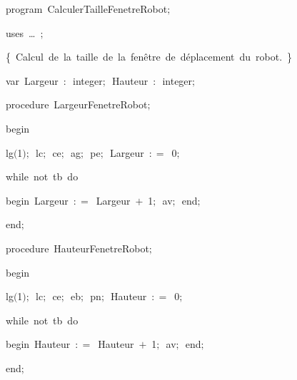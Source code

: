
{
\parindent {}
\medskip

\carrenoir
\vspace{\neglskip}\mbox{\blc  \idt  \mcl program\idt \ CalculerTailleFenetreRobot$;$
}\par 
\vspace{\neglskip}\mbox{\blc \blk\idt \mcl uses\idt \ \ldots\ $;$
}\par 
\vspace{\neglskip}\mbox{\blc  \blk\idt  \cmt  \{\ Calcul\ de\ la\ taille\ de\ la\ fen\^{e}tre\ de\ d\'{e}placement\ du\ robot.\ \}\idt }\par 
\pagebreak[3] 
\vspace{\neglskip}\mbox{\blc  \blk\idt  \mcl var\idt \ Largeur\ $:$\ integer$;$\ Hauteur\ $:$\ integer$;$\ }\par 
\medskip

\pagebreak[3] 
\vspace{\neglskip}\mbox{\blc  \blk\idt  \mcl procedure\idt \ LargeurFenetreRobot$;$}\par 
\vspace{\neglskip}\mbox{\blc  \blk\idt  \mcl begin\idt }\par 
\vspace{\neglskip}\mbox{\blc  \blk\blk\idt  lg$($1$)$$;$\ lc$;$\ ce$;$\ ag$;$\ pe$;$\ Largeur\ $:$$=$\ 0$;$}\par 
\pagebreak[3] 
\vspace{\neglskip}\mbox{\blc  \blk\blk\idt  \mcl while\idt \ \mcl not\idt \ tb\ \mcl do\idt }\par 
\vspace{\neglskip}\mbox{\blc  \blk\blk\blk\idt  \mcl begin\idt \ Largeur\ $:$$=$\ Largeur\ $+$\ 1$;$\ av$;$\ \mcl end\idt $;$}\par 
\vspace{\neglskip}\mbox{\blc  \blk\idt  \mcl end\idt $;$}\par 
\medskip

\pagebreak[3] 
\vspace{\neglskip}\mbox{\blc  \blk\idt  \mcl procedure\idt \ HauteurFenetreRobot$;$}\par 
\vspace{\neglskip}\mbox{\blc  \blk\idt  \mcl begin\idt }\par 
\vspace{\neglskip}\mbox{\blc  \blk\blk\idt  lg$($1$)$$;$\ lc$;$\ ce$;$\ eb$;$\ pn$;$\ Hauteur\ $:$$=$\ 0$;$}\par 
\pagebreak[3] 
\vspace{\neglskip}\mbox{\blc  \blk\blk\idt  \mcl while\idt \ \mcl not\idt \ tb\ \mcl do\idt }\par 
\vspace{\neglskip}\mbox{\blc  \blk\blk\blk\idt  \mcl begin\idt \ Hauteur\ $:$$=$\ Hauteur\ $+$\ 1$;$\ av$;$\ \mcl end\idt $;$}\par 
\vspace{\neglskip}\mbox{\blc  \blk\idt  \mcl end\idt $;$}\par 
\medskip

}
